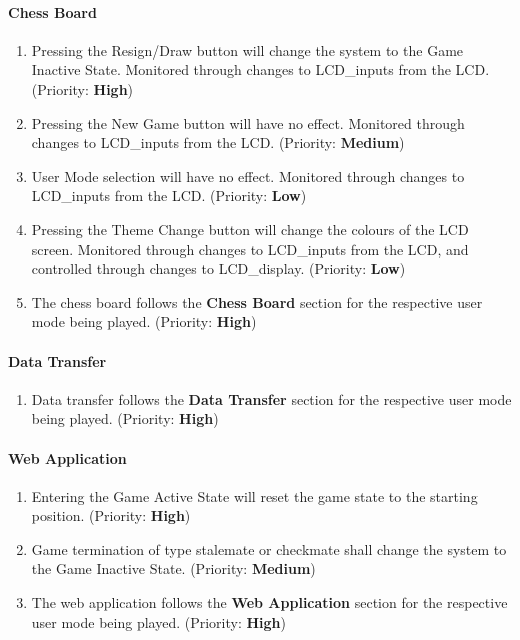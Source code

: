\documentclass[12pt]{article}
\begin{document}
\paragraph{Chess Board}
\begin{enumerate}[{GA}1., leftmargin=2\parindent]
    \item Pressing the Resign/Draw button will change the system to the Game Inactive State. Monitored through changes to LCD\_inputs from the LCD. (Priority: \textbf{High}) 
    \item Pressing the New Game button will have no effect. Monitored through changes to LCD\_inputs from the LCD. (Priority: \textbf{Medium}) 
    \item User Mode selection will have no effect. Monitored through changes to LCD\_inputs from the LCD. (Priority: \textbf{Low}) 
    \item Pressing the Theme Change button will change the colours of the LCD screen. Monitored through changes to LCD\_inputs from the LCD, and controlled through changes to LCD\_display. (Priority: \textbf{Low}) 
    \item The chess board follows the \textbf{Chess Board} section for the respective user mode being played. (Priority: \textbf{High}) 
\end{enumerate}

\paragraph{Data Transfer}
\begin{enumerate}[{GA}1., leftmargin=2\parindent, resume]
    \item Data transfer follows the \textbf{Data Transfer} section for the respective user mode being played. (Priority: \textbf{High}) 
\end{enumerate}

\paragraph{Web Application}
\begin{enumerate}[{GA}1., leftmargin=2\parindent, resume]
    \item Entering the Game Active State will reset the game state to the starting position. (Priority: \textbf{High}) 
    \item Game termination of type stalemate or checkmate shall change the system to the Game Inactive State. (Priority: \textbf{Medium}) 
    \item The web application follows the \textbf{Web Application} section for the respective user mode being played. (Priority: \textbf{High}) 
\end{enumerate}
\end{document}
